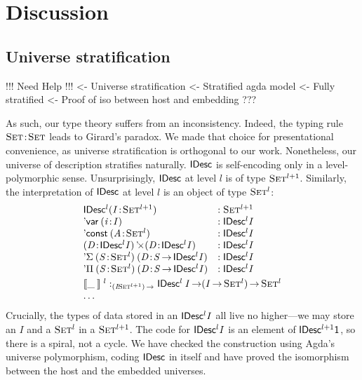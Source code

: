 \section{Discussion}
\label{sec:discussion}

\subsection{Universe stratification}

\begin{wstructure}
!!! Need Help !!!
<- Universe stratification
    <- Stratified agda model
        <- Fully stratified
        <- Proof of iso between host and embedding
    ???
\end{wstructure}

As such, our type theory suffers from an inconsistency. Indeed, the
typing rule $\Bhab{\Set}{\Set}$ leads to Girard's paradox. We made
that choice for presentational convenience, as universe stratification
is orthogonal to our work. Nonetheless, our universe of description
stratifies naturally. $\SYMBIDesc$ is self-encoding only in a
level-polymorphic sense.  Unsurprisingly, $\SYMBIDesc$ at level $l$ is
of type $\Set^{\blue{l+1}}$. Similarly, the interpretation of
$\SYMBIDesc$ at level $l$ is an object of type $\Set^{\blue{l}}$:
%
\[\stk{\begin{array}{@{}ll}
\SYMBIDesc^{\blue{l}} (\Bhab{\M{I}}{\Set^{\blue{l+1}}}) & :\Set^{\blue{l+1}} \\
\DVar{(\Bhab{\M{i}}{\M{I}})} &: \SYMBIDesc^{\blue{l}}{\M{I}} \\
\DConst{(\Bhab{\M{A}}{\Set^{\blue{l}}})} &:\SYMBIDesc^{\blue{l}}{\M{I}}       \\
\DProd{(\Bhab{\M{D}}{\SYMBIDesc^{\blue{l}}{\M{I}}})}{(\Bhab{\M{D}}{\SYMBIDesc^{\blue{l}}{\M{I}}})}
  & :\SYMBIDesc^{\blue{l}}{\M{I}}       \\
\DSigma{(\Bhab{\M{S}}{\Set^{\blue{l}}})}{(\Bhab{\M{D}}{\M{S}\To\SYMBIDesc^{\blue{l}}{\M{I}}})}
& : \SYMBIDesc^{\blue{l}}{\M{I}}  \\
\DPi{(\Bhab{\M{S}}{\Set^{\blue{l}}})}{(\Bhab{\M{D}}{\M{S}\To\SYMBIDesc^{\blue{l}}{\M{I}}})}
& : \SYMBIDesc^{\blue{l}}{\M{I}}  \\
\end{array}\smallskip \\
\idescop{\_\:}{}{}^{\blue{l}} : _{\PI{\V{I}}{\Set^{\blue{l+1}}}} \SYMBIDesc^{\blue{l}}\:\V{I} \To (\V{I} \To \Set^{\blue{l}}) \To \Set^{\blue{l}}    \\
\ldots
}
\]
Crucially, the types of data stored in an
\(\SYMBIDesc^{\blue{l}}{\M{I}}\) all live no higher---we may store an
\(I\) and a \(\Set^{\blue{l}}\) in a \(\Set^{\blue{l+1}}\).  The code
for \(\SYMBIDesc^{\blue{l}}{\M{I}}\) is an element of
\(\SYMBIDesc^{\blue{l+1}}{\Unit}\), so there is a spiral, not a cycle.
We have checked the construction using Agda's universe polymorphism,
coding $\SYMBIDesc$ in itself and have proved the isomorphism
between the host and the embedded universes.

